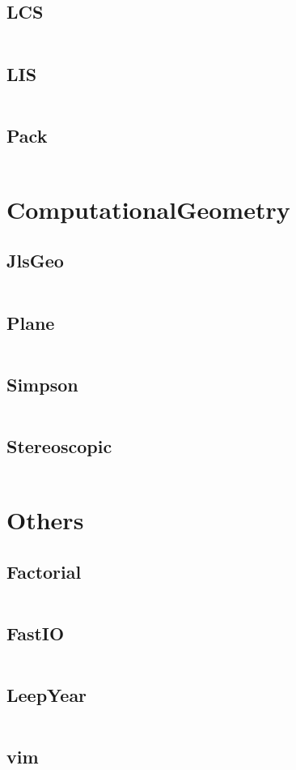 \documentclass[a4paper,11pt]{article}
\begin{document}
\subsection{LCS}
\inputminted[breaklines]{c++}{05++DynamicProgramming/+LCS.cpp}
\subsection{LIS}
\inputminted[breaklines]{c++}{05++DynamicProgramming/+LIS.cpp}
\subsection{Pack}
\inputminted[breaklines]{c++}{05++DynamicProgramming/+Pack.cpp}

\newpage
\section{ComputationalGeometry}
\subsection{JlsGeo}
\inputminted[breaklines]{c++}{06++ComputationalGeometry/+JlsGeo.cpp}
\subsection{Plane}
\inputminted[breaklines]{c++}{06++ComputationalGeometry/+Plane.cpp}
\subsection{Simpson}
\inputminted[breaklines]{c++}{06++ComputationalGeometry/+Simpson.cpp}
\subsection{Stereoscopic}
\inputminted[breaklines]{c++}{06++ComputationalGeometry/+Stereoscopic.cpp}

\newpage
\section{Others}
\subsection{Factorial}
\inputminted[breaklines]{c++}{07++Others/+Factorial.cpp}
\subsection{FastIO}
\inputminted[breaklines]{c++}{07++Others/+FastIO.cpp}
\subsection{LeepYear}
\inputminted[breaklines]{c++}{07++Others/+LeepYear.cpp}
\subsection{vim}
\inputminted[breaklines]{c++}{07++Others/+vim.vim}

\newpage
\end{document}
